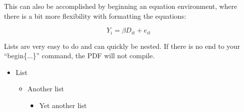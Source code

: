 \documentclass[12pt, letterpaper]{article}
\begin{document}
This can also be accomplished by beginning an equation environment, where there is a bit more flexibility with formatting the equations:

\begin{equation}
Y_i = \beta D_{it} + e_{it}
\end{equation}




\noindent Lists are very easy to do and can quickly be nested. If there is no end to your ``begin\{...\}'' command, the PDF will not compile.

\begin{itemize}
    \item List 
        \begin{itemize}
            \item Another list
                \begin{itemize}
                    \item Yet another list
                \end{itemize}
        \end{itemize}
\end{itemize}


\newpage

\printbibliography 
\end{document}

